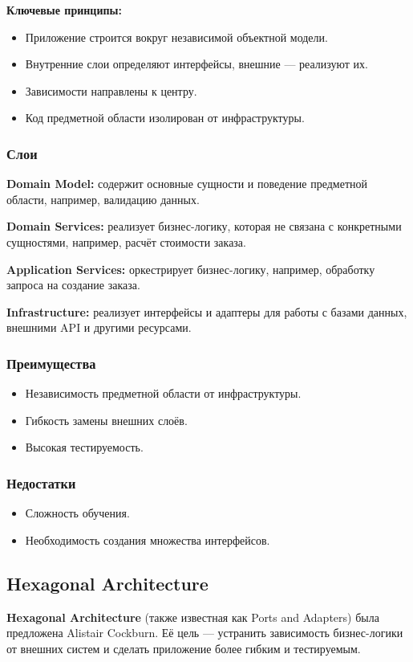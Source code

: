 \textbf{Ключевые принципы:}
\begin{itemize}
    \item Приложение строится вокруг независимой объектной модели.
    \item Внутренние слои определяют интерфейсы, внешние — реализуют их.
    \item Зависимости направлены к центру.
    \item Код предметной области изолирован от инфраструктуры.
\end{itemize}

\subsubsection{Слои}
\textbf{Domain Model:} содержит основные сущности и поведение предметной области, например, валидацию данных.

\textbf{Domain Services:} реализует бизнес-логику, которая не связана с конкретными сущностями, например, расчёт стоимости заказа.

\textbf{Application Services:} оркестрирует бизнес-логику, например, обработку запроса на создание заказа.

\textbf{Infrastructure:} реализует интерфейсы и адаптеры для работы с базами данных, внешними API и другими ресурсами.

\subsubsection{Преимущества}
\begin{itemize}
    \item Независимость предметной области от инфраструктуры.
    \item Гибкость замены внешних слоёв.
    \item Высокая тестируемость.
\end{itemize}

\subsubsection{Недостатки}
\begin{itemize}
    \item Сложность обучения.
    \item Необходимость создания множества интерфейсов.
\end{itemize}

\subsection{Hexagonal Architecture}
\textbf{Hexagonal Architecture} (также известная как Ports and Adapters) была предложена Alistair Cockburn. Её цель — устранить зависимость бизнес-логики от внешних систем и сделать приложение более гибким и тестируемым.

